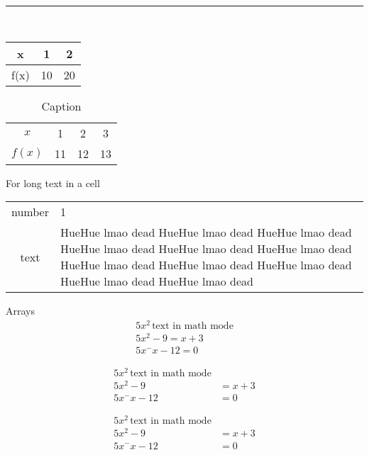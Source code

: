 \documentclass[11pt]{article}
\begin{document}
\rule{\textwidth}{0.5pt}
\\[12pt]
\begin{tabular}{c||c|c} %
    x & 1 & 2 \\ \hline
    f(x) & 10 & 20
\end{tabular}


\vspace{5cm}

\begin{table}[H]
    \centering
    \def\arraystretch{1.5}
    \begin{tabular}{c|c|c|c}
        $x$ & 1 & 2 & 3 \\
        $f(x)$ & 11 & 12 & 13
    \end{tabular}
    \caption{Caption}
    \label{tab:my_label}
\end{table}

For long text in a cell \\
\begin{tabular}{c|p{8cm}}
   number & 1 \\
   text & HueHue lmao dead HueHue lmao dead HueHue lmao dead HueHue lmao dead HueHue lmao dead HueHue lmao dead HueHue lmao dead HueHue lmao dead HueHue lmao dead HueHue lmao dead HueHue lmao dead
\end{tabular}

\vspace{4cm}
Arrays
\begin{align}
    5x^2 \, \text{text in math mode} \\
    5x^2 - 9 = x + 3 \\
    5x^ - x - 12 = 0
\end{align}


\begin{align}
    5x^2 \, \text{text in math mode} \\
    5x^2 - 9 &= x + 3 \\
    5x^ - x - 12 &= 0
\end{align}

\begin{align*}
    5x^2 \, \text{text in math mode} \\
    5x^2 - 9 &= x + 3 \\
    5x^ - x - 12 &= 0
\end{align*}
\end{document}
